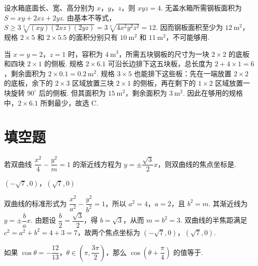 \begin{solution}
设水箱底面长、宽、高分别为 \(x\)，\(y\)，\(z\)，则 \(xyz=4\). 无盖水箱所需钢板面积为 \(S=xy+2xz+2yz\). 由基本不等式，
\(S\geqslant3\sqrt[3]{(xy)(2xz)(2yz)}=3\sqrt[3]{4x^{2}y^{2}z^{2}}=12\). 因而钢板面积至少为 \(12\mathrm{~m}^{2}\)，规格 \(2\times5\) 和 \(2\times5.5\) 的面积分别只有 \(10\mathrm{~m}^{2}\) 和 \(11\mathrm{~m}^{2}\)，不可能够用.

当 \(x=y=2\)，\(z=1\) 时，容积为 \(4\mathrm{~m}^{3}\)，所需五块钢板的尺寸为一块 \(2\times2\) 的底板和四块 \(2\times1\) 的侧板. 规格 \(2\times6.1\) 可沿长边排下这五块板，总长度为 \(2+4\times1=6\)，剩余面积为 \(2\times0.1=0.2\mathrm{~m}^{2}\). 规格 \(3\times5\) 也能排下这些板：先在一端放置 \(2\times2\) 的底板，余下的 \(2\times3\) 区域放置三块 \(2\times1\) 的侧板，再在剩下的 \(1\times2\) 区域放置一块旋转 \(90^\circ\) 后的侧板. 但其面积为 \(15\mathrm{~m}^{2}\)，剩余面积为 \(3\mathrm{~m}^{2}\). 因此在够用的规格中，\(2\times6.1\) 所剩最少，故选 C.
\end{solution}

\section{填空题}

\begin{problem}
若双曲线 \(\dfrac{x^{2}}{4}-\dfrac{y^{2}}{m}=1\) 的渐近线方程为 \(y=\pm\dfrac{\sqrt{3}}{2}x\)，则双曲线的焦点坐标是\fillinblank{}.
\end{problem}

\begin{answer}
\(\left(-\sqrt{7},0\right)\)，\(\left(\sqrt{7},0\right)\)
\end{answer}

\begin{solution}
双曲线的标准形式为 \(\dfrac{x^{2}}{a^{2}}-\dfrac{y^{2}}{b^{2}}=1\)，所以 \(a^{2}=4\)，\(a=2\)，且 \(b^{2}=m\). 其渐近线为 \(y=\pm\dfrac{b}{a}x\). 由题设 \(\dfrac{b}{2}=\dfrac{\sqrt{3}}{2}\)，得 \(b=\sqrt{3}\)，从而 \(m=b^{2}=3\). 双曲线的半焦距满足 \(c^{2}=a^{2}+b^{2}=4+3=7\)，故两个焦点坐标为 \(\left(-\sqrt{7},0\right)\)，\(\left(\sqrt{7},0\right)\).
\end{solution}

\begin{problem}
如果 \(\cos\theta=-\dfrac{12}{13}\)，\(\theta\in\left(\pi,\dfrac{3\pi}{2}\right)\)，那么 \(\cos\left(\theta+\dfrac{\pi}{4}\right)\) 的值等于\fillinblank{}.
\end{problem}

